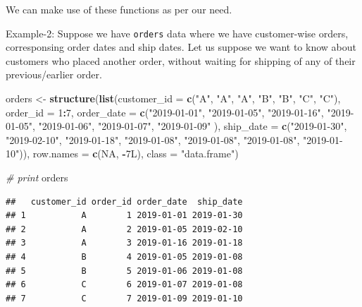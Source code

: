 \documentclass[
]{book}
\newenvironment{Shaded}{\begin{snugshade}}{\end{snugshade}}
\newcommand{\AttributeTok}[1]{\textcolor[rgb]{0.13,0.29,0.53}{#1}}
\newcommand{\CommentTok}[1]{\textcolor[rgb]{0.56,0.35,0.01}{\textit{#1}}}
\newcommand{\ConstantTok}[1]{\textcolor[rgb]{0.56,0.35,0.01}{#1}}
\newcommand{\DecValTok}[1]{\textcolor[rgb]{0.00,0.00,0.81}{#1}}
\newcommand{\FunctionTok}[1]{\textcolor[rgb]{0.13,0.29,0.53}{\textbf{#1}}}
\newcommand{\NormalTok}[1]{#1}
\newcommand{\OtherTok}[1]{\textcolor[rgb]{0.56,0.35,0.01}{#1}}
\newcommand{\SpecialCharTok}[1]{\textcolor[rgb]{0.81,0.36,0.00}{\textbf{#1}}}
\newcommand{\StringTok}[1]{\textcolor[rgb]{0.31,0.60,0.02}{#1}}
\begin{document}
We can make use of these functions as per our need.

Example-2: Suppose we have \texttt{orders} data where we have customer-wise orders, corresponsing order dates and ship dates. Let us suppose we want to know about customers who placed another order, without waiting for shipping of any of their previous/earlier order.

\begin{Shaded}
\begin{Highlighting}[]
\NormalTok{orders }\OtherTok{\textless{}{-}} \FunctionTok{structure}\NormalTok{(}\FunctionTok{list}\NormalTok{(}\AttributeTok{customer\_id =} \FunctionTok{c}\NormalTok{(}\StringTok{"A"}\NormalTok{, }\StringTok{"A"}\NormalTok{, }\StringTok{"A"}\NormalTok{, }\StringTok{"B"}\NormalTok{, }\StringTok{"B"}\NormalTok{, }\StringTok{"C"}\NormalTok{, }
\StringTok{"C"}\NormalTok{), }\AttributeTok{order\_id =} \DecValTok{1}\SpecialCharTok{:}\DecValTok{7}\NormalTok{, }\AttributeTok{order\_date =} \FunctionTok{c}\NormalTok{(}\StringTok{"2019{-}01{-}01"}\NormalTok{, }\StringTok{"2019{-}01{-}05"}\NormalTok{, }
\StringTok{"2019{-}01{-}16"}\NormalTok{, }\StringTok{"2019{-}01{-}05"}\NormalTok{, }\StringTok{"2019{-}01{-}06"}\NormalTok{, }\StringTok{"2019{-}01{-}07"}\NormalTok{, }\StringTok{"2019{-}01{-}09"}
\NormalTok{), }\AttributeTok{ship\_date =} \FunctionTok{c}\NormalTok{(}\StringTok{"2019{-}01{-}30"}\NormalTok{, }\StringTok{"2019{-}02{-}10"}\NormalTok{, }\StringTok{"2019{-}01{-}18"}\NormalTok{, }\StringTok{"2019{-}01{-}08"}\NormalTok{, }
\StringTok{"2019{-}01{-}08"}\NormalTok{, }\StringTok{"2019{-}01{-}08"}\NormalTok{, }\StringTok{"2019{-}01{-}10"}\NormalTok{)), }\AttributeTok{row.names =} \FunctionTok{c}\NormalTok{(}\ConstantTok{NA}\NormalTok{, }
\SpecialCharTok{{-}}\NormalTok{7L), }\AttributeTok{class =} \StringTok{"data.frame"}\NormalTok{)}

\CommentTok{\# print }
\NormalTok{orders}
\end{Highlighting}
\end{Shaded}

\begin{verbatim}
##   customer_id order_id order_date  ship_date
## 1           A        1 2019-01-01 2019-01-30
## 2           A        2 2019-01-05 2019-02-10
## 3           A        3 2019-01-16 2019-01-18
## 4           B        4 2019-01-05 2019-01-08
## 5           B        5 2019-01-06 2019-01-08
## 6           C        6 2019-01-07 2019-01-08
## 7           C        7 2019-01-09 2019-01-10
\end{verbatim}
\end{document}
